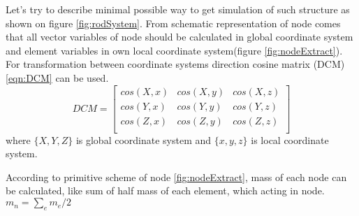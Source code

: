 \par
Let's try to describe minimal possible way to get simulation of such structure
 as shown on figure \ref{fig:rodSystem}. From schematic representation of node
 comes that all vector variables of node should be calculated in global
 coordinate system and element variables in own local coordinate system(figure
 \ref{fig:nodeExtract}). For transformation between coordinate systems direction
 cosine matrix (DCM)\eqref{eqn:DCM} can be used.
\begin{equation}\label{eqn:DCM}
  DCM= \begin{bmatrix}
    cos(X,x)&cos(X,y)&cos(X,z)\\
    cos(Y,x)&cos(Y,y)&cos(Y,z)\\
    cos(Z,x)&cos(Z,y)&cos(Z,z)\\
   \end{bmatrix} 
\end{equation}
where $\{X, Y, Z\}$ is global coordinate system and $\{x,y,z\}$ is local coordinate
system.\par According to primitive scheme of node \ref{fig:nodeExtract}, mass of
each node can be calculated, like sum of half mass of each element, which acting
in node. $m_n=\sum_{e}m_e/2$\par
\newpage